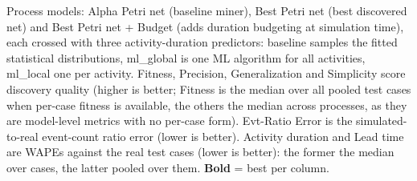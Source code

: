 \begin{table}[t]
Process models: Alpha Petri net (baseline miner), Best Petri net (best discovered net) and Best Petri net + Budget (adds duration budgeting at simulation time), each crossed with three activity-duration predictors: baseline samples the fitted statistical distributions, ml\_global is one ML algorithm for all activities, ml\_local one per activity. Fitness, Precision, Generalization and Simplicity score discovery quality (higher is better; Fitness is the median over all pooled test cases when per-case fitness is available, the others the median across processes, as they are model-level metrics with no per-case form). Evt-Ratio Error is the simulated-to-real event-count ratio error (lower is better). Activity duration and Lead time are WAPEs against the real test cases (lower is better): the former the median over cases, the latter pooled over them. \textbf{Bold} = best per column.

\end{table}
